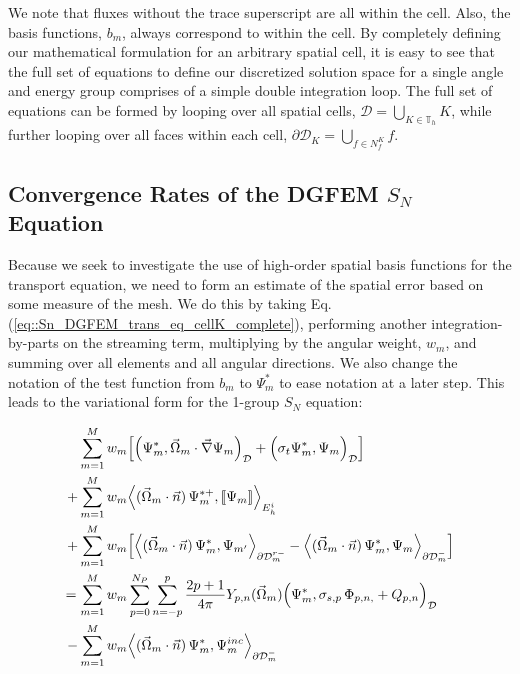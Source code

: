 \noindent We note that fluxes without the trace superscript are all within the cell. Also, the basis functions, $b_m$, always correspond to within the cell. By completely defining our mathematical formulation for an arbitrary spatial cell, it is easy to see that the full set of equations to define our discretized solution space for a single angle and energy group comprises of a simple double integration loop. The full set of equations can be formed by looping over all spatial cells, $\mathcal{D} = \bigcup_{K \in \mathbb{T}_h} K$, while further looping over all faces within each cell, $\partial \mathcal{D}_K = \bigcup_{ f \in N_f^K} f$. 

\subsection{Convergence Rates of the DGFEM $S_N$ Equation}
\label{sec::Sn_Spatial_Convergence}

Because we seek to investigate the use of high-order spatial basis functions for the transport equation, we need to form an estimate of the spatial error based on some measure of the mesh. We do this by taking Eq. (\ref{eq::Sn_DGFEM_trans_eq_cellK_complete}), performing another integration-by-parts on the streaming term, multiplying by the angular weight, $w_m$, and summing over all elements and all angular directions. We also change the notation of the test function from $b_m$ to $\Psi_m^{*}$ to ease notation at a later step. This leads to the variational form for the 1-group $S_N$ equation:

\begin{equation}
\label{eq::Sn_DGFEM_variational_form}
\begin{aligned}
\sum\displaylimits_{m=1}^M w_m& \Big[  \Big(  \Psi_m^*, \vec{\Omega}_m \cdot   \vec{\nabla} \Psi_{m} \Big)_{\mathcal{D}} + \Big( \sigma_t  \Psi_m^{*},  \Psi_{m} \Big)_{\mathcal{D}}  \Big]  \\
+ \sum\displaylimits_{m=1}^M w_m& \Big< ( \vec{\Omega}_m \cdot \vec{n} ) \, \Psi_m^{* +}, [\![ \Psi_m]\!]  \Big>_{E_h^i} \\
+ \sum\displaylimits_{m=1}^M w_m& \Big[ \Big< ( \vec{\Omega}_m \cdot \vec{n} ) \, \Psi_m^{*}, {\Psi}_{m'}  \Big>_{\partial \mathcal{D}_m^{r-}} -  \Big< ( \vec{\Omega}_m \cdot \vec{n} ) \, \Psi_m^{*}, {\Psi}_m  \Big>_{\partial \mathcal{D}_m^-}   \Big] \\
= \sum\displaylimits_{m=1}^M w_m&     \sum_{p=0}^{N_P} \sum_{n=-p}^{p} \frac{2p + 1}{4 \pi}  Y_{p,n} (  \vec{\Omega}_m )  \Big(   \Psi_m^{*}, \sigma_{s,p} \,  \Phi_{p,n,} +  Q_{p,n} \Big)_{\mathcal{D}}  \\
- \sum\displaylimits_{m=1}^M w_m&   \Big< ( \vec{\Omega}_m \cdot \vec{n} ) \, \Psi_m^{*}, {\Psi}_m^{inc}  \Big>_{\partial \mathcal{D}_m^- }
\end{aligned}
\end{equation}

